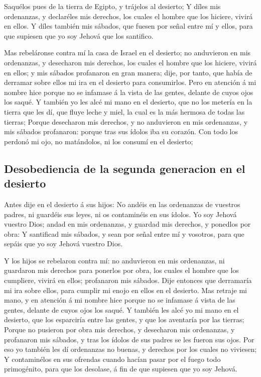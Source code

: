  Saquélos pues de la tierra de Egipto, y trájelos al
desierto;  Y díles mis ordenanzas, y declaréles mis
derechos, los cuales el hombre que los hiciere, vivirá en ellos.
 Y díles también mis sábados, que fuesen por señal entre mí
y ellos, para que supiesen que yo soy Jehová que los santifico.

 Mas rebeláronse contra mí la casa de Israel en el
desierto; no anduvieron en mis ordenanzas, y desecharon mis derechos,
los cuales el hombre que los hiciere, vivirá en ellos; y mis sábados
profanaron en gran manera; dije, por tanto, que había de derramar sobre
ellos mi ira en el desierto para consumirlos.  Pero en
atención á mi nombre hice porque no se infamase á la vista de las
gentes, delante de cuyos ojos los saqué.  Y también yo les
alcé mi mano en el desierto, que no los metería en la tierra que les dí,
que fluye leche y miel, la cual es la más hermosa de todas las tierras;
 Porque desecharon mis derechos, y no anduvieron en mis
ordenanzas, y mis sábados profanaron: porque tras sus ídolos iba su
corazón.  Con todo los perdonó mi ojo, no matándolos, ni
los consumí en el desierto;

\hypertarget{desobediencia-de-la-segunda-generacion-en-el-desierto}{%
\subsection{Desobediencia de la segunda generacion en el
desierto}\label{desobediencia-de-la-segunda-generacion-en-el-desierto}}

 Antes dije en el desierto á sus hijos: No andéis en las
ordenanzas de vuestros padres, ni guardéis sus leyes, ni os contaminéis
en sus ídolos.  Yo soy Jehová vuestro Dios; andad en mis
ordenanzas, y guardad mis derechos, y ponedlos por obra:  Y
santificad mis sábados, y sean por señal entre mí y vosotros, para que
sepáis que yo soy Jehová vuestro Dios.

 Y los hijos se rebelaron contra mí: no anduvieron en mis
ordenanzas, ni guardaron mis derechos para ponerlos por obra, los cuales
el hombre que los cumpliere, vivirá en ellos; profanaron mis sábados.
Dije entonces que derramaría mi ira sobre ellos, para cumplir mi enojo
en ellos en el desierto.  Mas retraje mi mano, y en
atención á mi nombre hice porque no se infamase á vista de las gentes,
delante de cuyos ojos los saqué.  Y también les alcé yo mi
mano en el desierto, que los esparciría entre las gentes, y que los
aventaría por las tierras;  Porque no pusieron por obra mis
derechos, y desecharon mis ordenanzas, y profanaron mis sábados, y tras
los ídolos de sus padres se les fueron sus ojos.  Por eso
yo también les dí ordenanzas no buenas, y derechos por los cuales no
viviesen;  Y contaminélos en sus ofrendas cuando hacían
pasar por el fuego todo primogénito, para que los desolase, á fin de que
supiesen que yo soy Jehová.

